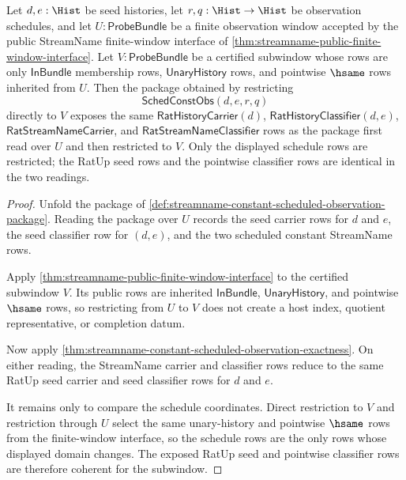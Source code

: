 \begin{theorem}
\label{thm:streamname-scheduled-subwindow-constant-observation-coherence}
Let $d,e:\Hist$ be seed histories, let $r,q:\Hist\to\Hist$ be observation
schedules, and let $U:\mathsf{ProbeBundle}$ be a finite observation window
accepted by the public StreamName finite-window interface of
\autoref{thm:streamname-public-finite-window-interface}. Let
$V:\mathsf{ProbeBundle}$ be a certified subwindow whose rows are only
$\mathsf{InBundle}$ membership rows, $\mathsf{UnaryHistory}$ rows, and
pointwise $\hsame$ rows inherited from $U$. Then the package obtained by
restricting
$$
\mathsf{SchedConstObs}(d,e,r,q)
$$
directly to $V$ exposes the same $\mathsf{RatHistoryCarrier}(d)$,
$\mathsf{RatHistoryClassifier}(d,e)$, $\mathsf{RatStreamNameCarrier}$, and
$\mathsf{RatStreamNameClassifier}$ rows as the package first read over $U$ and
then restricted to $V$. Only the displayed schedule rows are restricted; the
RatUp seed rows and the pointwise classifier rows are identical in the two
readings.
\end{theorem}
\begin{proof}
Unfold the package of
\autoref{def:streamname-constant-scheduled-observation-package}. Reading the
package over $U$ records the seed carrier rows for $d$ and $e$, the seed
classifier row for $(d,e)$, and the two scheduled constant StreamName rows.

Apply \autoref{thm:streamname-public-finite-window-interface} to the certified
subwindow $V$. Its public rows are inherited $\mathsf{InBundle}$,
$\mathsf{UnaryHistory}$, and pointwise $\hsame$ rows, so restricting from $U$
to $V$ does not create a host index, quotient representative, or completion
datum.

Now apply
\autoref{thm:streamname-constant-scheduled-observation-exactness}. On either
reading, the StreamName carrier and classifier rows reduce to the same RatUp
seed carrier and seed classifier rows for $d$ and $e$.

It remains only to compare the schedule coordinates. Direct restriction to
$V$ and restriction through $U$ select the same unary-history and pointwise
$\hsame$ rows from the finite-window interface, so the schedule rows are the
only rows whose displayed domain changes. The exposed RatUp seed and
pointwise classifier rows are therefore coherent for the subwindow.
\end{proof}


